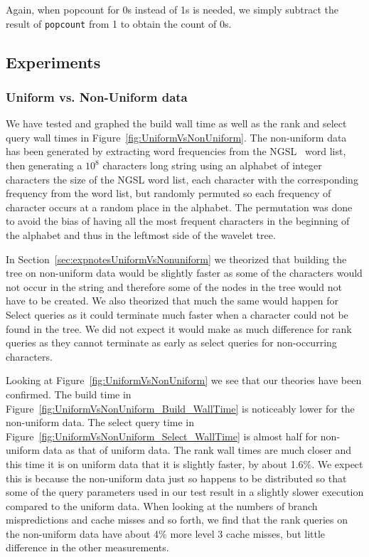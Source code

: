 Again, when popcount for 0s instead of 1s is needed, we simply subtract the result of \texttt{popcount} from 1 to obtain the count of 0s.

\subsection{Experiments}

\subsubsection{Uniform vs. Non-Uniform data}
\label{sec:uniformVsNonUniform}
We have tested and graphed the build wall time as well as the rank and select query wall times in Figure~\ref{fig:UniformVsNonUniform}.
The non-uniform data has been generated by extracting word frequencies from the NGSL~ word list, then generating a $10^8$ characters long string using an alphabet of integer characters the size of the NGSL word list, each character with the corresponding frequency from the word list, but randomly permuted so each frequency of character occurs at a random place in the alphabet.
The permutation was done to avoid the bias of having all the most frequent characters in the beginning of the alphabet and thus in the leftmost side of the wavelet tree.

In Section~\ref{sec:expnotesUniformVsNonuniform} we theorized that building the tree on non-uniform data would be slightly faster as some of the characters would not occur in the string and therefore some of the nodes in the tree would not have to be created.
We also theorized that much the same would happen for Select queries as it could terminate much faster when a character could not be found in the tree.
We did not expect it would make as much difference for rank queries as they cannot terminate as early as select queries for non-occurring characters.

Looking at Figure~\ref{fig:UniformVsNonUniform} we see that our theories have been confirmed. 
The build time in Figure~\ref{fig:UniformVsNonUniform_Build_WallTime} is noticeably lower for the non-uniform data.
The select query time in Figure~\ref{fig:UniformVsNonUniform_Select_WallTime} is almost half for non-uniform data as that of uniform data.
The rank wall times are much closer and this time it is on uniform data that it is slightly faster, by about 1.6\%.
We expect this is because the non-uniform data just so happens to be distributed so that some of the query parameters used in our test result in a slightly slower execution compared to the uniform data.
When looking at the numbers of branch mispredictions and cache misses and so forth, we find that the rank queries on the non-uniform data have about 4\% more level 3 cache misses, but little difference in the other measurements.


